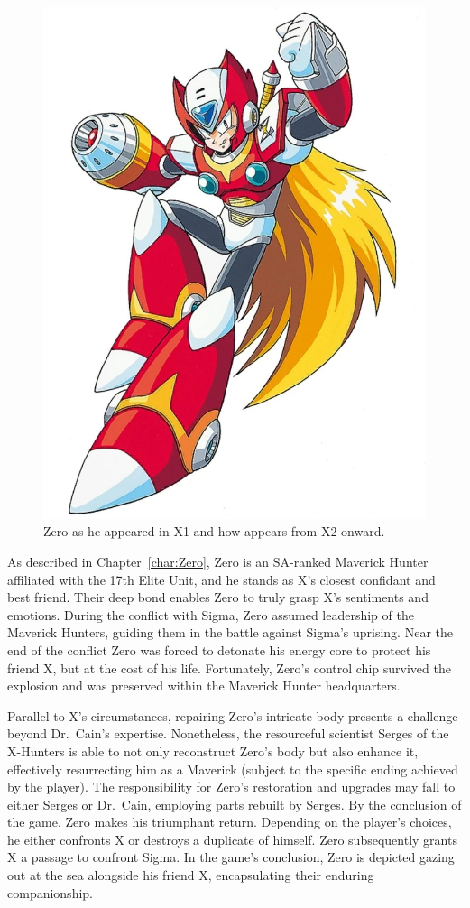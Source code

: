 \begin{figure}[htp]
	\includegraphics[height=\portraitsize]{figures/X2/Hunter_stages/Zero.png}
	\caption{Zero as he appeared in X1 and how appears from X2 onward.}
\end{figure}

As described in Chapter~\ref{char:Zero}, Zero is an SA-ranked Maverick Hunter affiliated with the 17th Elite Unit, and he stands as X's closest confidant and best friend. Their deep bond enables Zero to truly grasp X's sentiments and emotions. During the conflict with Sigma, Zero assumed leadership of the Maverick Hunters, guiding them in the battle against Sigma's uprising. Near the end of the conflict Zero was forced to detonate his energy core to protect his friend X, but at the cost of his life. Fortunately, Zero's control chip survived the explosion and was preserved within the Maverick Hunter headquarters.

Parallel to X's circumstances, repairing Zero's intricate body presents a challenge beyond Dr.~Cain's expertise. Nonetheless, the resourceful scientist Serges of the X-Hunters is able to not only reconstruct Zero's body but also enhance it, effectively resurrecting him as a Maverick\cite{wayback:X2_resources} (subject to the specific ending achieved by the player). The responsibility for Zero's restoration and upgrades may fall to either Serges or Dr.~Cain, employing parts rebuilt by Serges. By the conclusion of the game, Zero makes his triumphant return. Depending on the player's choices, he either confronts X or destroys a duplicate of himself. Zero subsequently grants X a passage to confront Sigma. In the game's conclusion, Zero is depicted gazing out at the sea alongside his friend X, encapsulating their enduring companionship.

